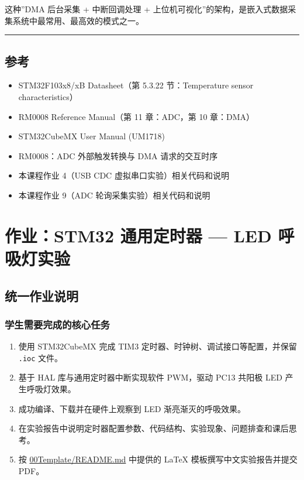 \documentclass[
  chinese,
  UTF8,
  oneside,
  openany]{ctexbook}
\providecommand{\tightlist}{%
  \setlength{\itemsep}{0pt}\setlength{\parskip}{0pt}}
\begin{document}
这种''DMA 后台采集 + 中断回调处理 +
上位机可视化''的架构，是嵌入式数据采集系统中最常用、最高效的模式之一。

\begin{center}\rule{0.5\linewidth}{0.5pt}\end{center}

\section{参考}\label{ux53c2ux8003-1}

\begin{itemize}
\tightlist
\item
  STM32F103x8/xB Datasheet（第 5.3.22 节：Temperature sensor
  characteristics）
\item
  RM0008 Reference Manual（第 11 章：ADC，第 10 章：DMA）
\item
  STM32CubeMX User Manual (UM1718)
\item
  RM0008：ADC 外部触发转换与 DMA 请求的交互时序
\item
  本课程作业 4（USB CDC 虚拟串口实验）相关代码和说明
\item
  本课程作业 9（ADC 轮询采集实验）相关代码和说明
\end{itemize}

\chapter{作业：STM32 通用定时器 --- LED
呼吸灯实验}\label{ux4f5cux4e1astm32-ux901aux7528ux5b9aux65f6ux5668-led-ux547cux5438ux706fux5b9eux9a8c}

\section{统一作业说明}\label{ux7edfux4e00ux4f5cux4e1aux8bf4ux660e-6}

\subsection{学生需要完成的核心任务}\label{ux5b66ux751fux9700ux8981ux5b8cux6210ux7684ux6838ux5fc3ux4efbux52a1-6}

\begin{enumerate}
\def\labelenumi{\arabic{enumi}.}
\tightlist
\item
  使用 STM32CubeMX 完成 TIM3 定时器、时钟树、调试接口等配置，并保留
  \texttt{.ioc} 文件。
\item
  基于 HAL 库与通用定时器中断实现软件 PWM，驱动 PC13 共阳极 LED
  产生呼吸灯效果。
\item
  成功编译、下载并在硬件上观察到 LED 渐亮渐灭的呼吸效果。
\item
  在实验报告中说明定时器配置参数、代码结构、实验现象、问题排查和课后思考。
\item
  按 \href{../00Template/README.md}{00Template/README.md} 中提供的 LaTeX
  模板撰写中文实验报告并提交 PDF。
\end{enumerate}
\end{document}
